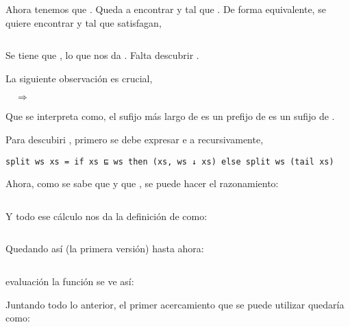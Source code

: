 
Ahora tenemos que .
Queda a encontrar  y  tal que .
De forma equivalente, se quiere encontrar  y  tal que satisfagan, 

\inputminted{haskell}{definiciones/kmp/1-split-eq.hs}

Se tiene que , lo que nos da . Falta descubrir .

La siguiente observación es crucial,

 $\quad\Longrightarrow\quad$ 

Que se interpreta como, el sufijo más largo de  es un prefijo de  es un sufijo de .

Para descubiri , primero se debe expresar e a  recursivamente,

\begin{verbatim}
split ws xs = if xs ⊑ ws then (xs, ws ↓ xs) else split ws (tail xs)
\end{verbatim}


Ahora, como se sabe que  y que , se puede hacer el razonamiento:

\inputminted{haskell}{definiciones/kmp/1-op-raz-eq.hs}

Y todo ese cálculo nos da la definición de  como:

\inputminted{haskell}{definiciones/kmp/1-op.hs}

Quedando así (la primera versión) hasta ahora:

\inputminted{haskell}{definiciones/kmp/1-final.hs}


evaluación  la función  se ve así:


Juntando todo lo anterior, el primer acercamiento que se puede utilizar quedaría como:

